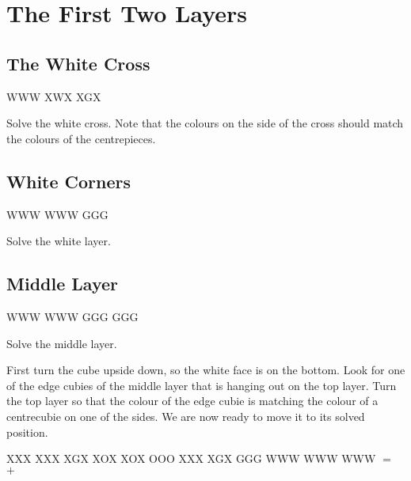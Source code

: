 \documentclass{article}
\begin{document}
    \section{The First Two Layers}

    \subsection{The White Cross}

    \RubikCubeGreyWY
     {W}{W}{W} {X}{W}{X}
     {X}{G}{X}

    \begin{goal}
        Solve the white cross.
        Note that the colours on the side of the cross should match the colours of the centrepieces.
    \end{goal}


    \subsection{White Corners}

    \RubikCubeGreyWY
     {W}{W}{W} {W}{W}{W}
     {G}{G}{G}

    \begin{goal}
        Solve the white layer.
    \end{goal}


    \subsection{Middle Layer}

    \RubikCubeGreyWY
     {W}{W}{W} {W}{W}{W}
     {G}{G}{G}
     {G}{G}{G}

    \begin{goal}
        Solve the middle layer.
    \end{goal}
    First turn the cube upside down, so the white face is on the bottom.
    Look for one of the edge cubies of the middle layer that is hanging out on the top layer.
    Turn the top layer so that the colour of the edge cubie is matching the colour of a centrecubie on one of the sides.
    We are now ready to move it to its solved position.

    \RubikCubeGreyWY
    \RubikFaceUp XXX XXX XGX
    \RubikFaceFront XOX XOX OOO
    \RubikFaceRight XXX XGX GGG
    \RubikFaceDown WWW WWW WWW
    \quad$=$\quad%
    \quad$+$\quad%
\end{document}
